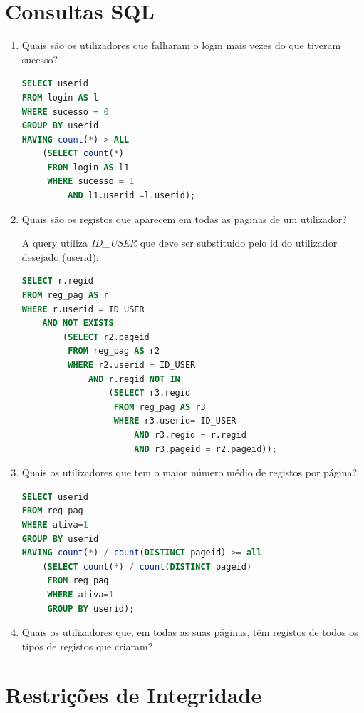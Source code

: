 \documentclass[11pt,a4paper]{article}
\begin{document}
\section{Consultas SQL}
\begin{enumerate}[label=(\alph*)]
	\item Quais são os utilizadores que falharam o login mais vezes do que tiveram sucesso?
		\begin{lstlisting}[language=SQL]
SELECT userid
FROM login AS l
WHERE sucesso = 0
GROUP BY userid
HAVING count(*) > ALL
    (SELECT count(*)
     FROM login AS l1
     WHERE sucesso = 1
         AND l1.userid =l.userid);
		\end{lstlisting}

	\item Quais são os registos que aparecem em todas as paginas de um utilizador?
	
	A query utiliza \textit{ID\_USER} que deve ser substituido pelo id do utilizador desejado (userid):
		\begin{lstlisting}[language=SQL]
SELECT r.regid
FROM reg_pag AS r
WHERE r.userid = ID_USER
    AND NOT EXISTS
        (SELECT r2.pageid
         FROM reg_pag AS r2
         WHERE r2.userid = ID_USER
             AND r.regid NOT IN
                 (SELECT r3.regid
                  FROM reg_pag AS r3
                  WHERE r3.userid= ID_USER
                      AND r3.regid = r.regid
                      AND r3.pageid = r2.pageid));
        		\end{lstlisting}
	\item Quais os utilizadores que tem o maior número médio de registos por página?
		\begin{lstlisting}[language=SQL]
SELECT userid
FROM reg_pag
WHERE ativa=1
GROUP BY userid
HAVING count(*) / count(DISTINCT pageid) >= all
    (SELECT count(*) / count(DISTINCT pageid)
     FROM reg_pag
     WHERE ativa=1
     GROUP BY userid);
		\end{lstlisting}
	
	\item Quais os utilizadores que, em todas as suas páginas, têm registos de todos os tipos de registos que criaram?
\end{enumerate}

\newpage

\section{Restrições de Integridade}
\newpage
\end{document}
